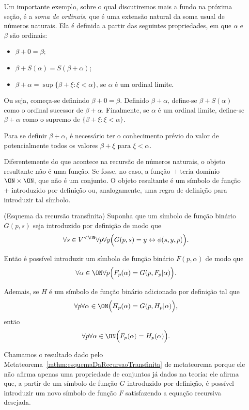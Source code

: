 Um importante exemplo, sobre o qual discutiremos mais a fundo na próxima seção, é a \emph{soma de ordinais}, que é uma extensão natural da soma usual de números naturais.
Ela é definida a partir das seguintes propriedades, em que $\alpha$ e $\beta$ são ordinais:
\begin{itemize}
    \item $\beta+0=\beta$;
    \item $\beta+S(\alpha)=S(\beta+\alpha)$;
    \item $\beta+\alpha=\sup\{\beta+\xi : \xi <\alpha\}$, se $\alpha$ é um ordinal limite.
\end{itemize}
Ou seja, começa-se definindo $\beta+0=\beta$.
Definido $\beta+\alpha$, define-se $\beta+S(\alpha)$ como o ordinal sucessor de $\beta+\alpha$.
Finalmente, se $\alpha$ é um ordinal limite, define-se $\beta+\alpha$ como o supremo de $\{\beta+\xi : \xi <\alpha\}$.

Para se definir $\beta+\alpha$, é necessário ter o conhecimento prévio do valor de potencialmente todos os valores $\beta+\xi$ para $\xi <\alpha$.

Diferentemente do que acontece na recursão de números naturais, o objeto resultante não é uma função.
Se fosse, no caso, a função $+$ teria domínio $\ON\times \ON$, que não é um conjunto.
O objeto resultante é um símbolo de função $+$ introduzido por definição ou, analogamente, uma regra de definição para introduzir tal símbolo.

\begin{metatheorem}[$\ZFmPI$](Esquema da recursão transfinita)\label{mthm:esquemaDaRecursaoTransfinita}
    Suponha que um símbolo de função binário $G(p, s)$ seja introduzido por definição de modo que
    \[
        \forall s \in V^{<\ON}\forall p\forall y
        \Bigl(G(p,s)=y \leftrightarrow \phi(s,y,p)\Bigr).
    \]

    Então é possível introduzir um símbolo de função binário $F(p, \alpha)$ de modo que
    \[
        \forall \alpha \in \ON \forall p \Big( F_{p}(\alpha)=G(p, F_p|\alpha)\Big).
    \]

    Ademais, se $H$ é um símbolo de função binário adicionado por definição tal que
    \[
        \forall p \forall \alpha \in \ON \Bigl( H_p(\alpha)=G(p, H_p|\alpha)\Bigr),
    \]
    então
    \[
        \forall p \forall \alpha \in \ON \Bigl( F_p(\alpha)=H_p(\alpha)\Bigr).
    \]
\end{metatheorem}
Chamamos o resultado dado pelo Metateorema~\ref{mthm:esquemaDaRecursaoTransfinita} de metateorema porque ele não afirma apenas uma propriedade de conjuntos já dados na teoria: ele afirma que, a partir de um símbolo de função $G$ introduzido por definição, é possível introduzir um novo símbolo de função $F$ satisfazendo a equação recursiva desejada.

